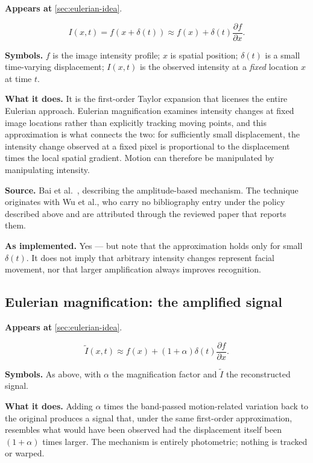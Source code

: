 \textbf{Appears at} \autoref{sec:eulerian-idea}.

\[
    I(x,t)=f(x+\delta(t))
       \approx f(x)+\delta(t)\frac{\partial f}{\partial x}.
\]

\textbf{Symbols.} $f$ is the image intensity profile; $x$ is spatial
position; $\delta(t)$ is a small time-varying displacement; $I(x,t)$ is the
observed intensity at a \emph{fixed} location $x$ at time $t$.

\textbf{What it does.} It is the first-order Taylor expansion that licenses
the entire Eulerian approach. Eulerian magnification examines intensity
changes at fixed image locations rather than explicitly tracking moving
points, and this approximation is what connects the two: for sufficiently
small displacement, the intensity change observed at a fixed pixel is
proportional to the displacement times the local spatial gradient. Motion can
therefore be manipulated by manipulating intensity.

\textbf{Source.} Bai et al.~\cite{bai2021}, describing the amplitude-based
mechanism. The technique originates with Wu et al., who carry no bibliography
entry under the policy described above and are attributed through the reviewed
paper that reports them.

\textbf{As implemented.} Yes --- but note that the approximation holds only
for small $\delta(t)$. It does not imply that arbitrary intensity changes
represent facial movement, nor that larger amplification always improves
recognition.

\subsection{Eulerian magnification: the amplified signal}
\label{eq:evm-amplified}

\textbf{Appears at} \autoref{sec:eulerian-idea}.

\[
    \widetilde I(x,t)\approx
       f(x)+(1+\alpha)\delta(t)\frac{\partial f}{\partial x}.
\]

\textbf{Symbols.} As above, with $\alpha$ the magnification factor and
$\widetilde I$ the reconstructed signal.

\textbf{What it does.} Adding $\alpha$ times the band-passed motion-related
variation back to the original produces a signal that, under the same
first-order approximation, resembles what would have been observed had the
displacement itself been $(1+\alpha)$ times larger. The mechanism is entirely
photometric; nothing is tracked or warped.


